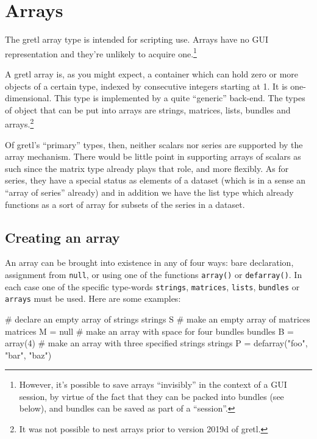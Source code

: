 \section{Arrays}
\label{sec:arrays}

The gretl array type is intended for scripting use. Arrays have no GUI
representation and they're unlikely to acquire one.\footnote{However,
  it's possible to save arrays ``invisibly'' in the context of a GUI
  session, by virtue of the fact that they can be packed into bundles
  (see below), and bundles can be saved as part of a ``session''.}

A gretl array is, as you might expect, a container which can hold zero
or more objects of a certain type, indexed by consecutive integers
starting at 1. It is one-dimensional. This type is implemented by a
quite ``generic'' back-end. The types of object that can be put into
arrays are strings, matrices, lists, bundles and arrays.\footnote{It
  was not possible to nest arrays prior to version 2019d of gretl.}

Of gretl's ``primary'' types, then, neither scalars nor series are
supported by the array mechanism. There would be little point in
supporting arrays of scalars as such since the matrix type already
plays that role, and more flexibly. As for series, they have a special
status as elements of a dataset (which is in a sense an ``array of
series'' already) and in addition we have the list type which already
functions as a sort of array for subsets of the series in a dataset.

\subsection{Creating an array}

An array can be brought into existence in any of four ways: bare
declaration, assignment from \texttt{null}, or using one of the
functions \texttt{array()} or \texttt{defarray()}.  In each case one
of the specific type-words \texttt{strings}, \texttt{matrices},
\texttt{lists}, \texttt{bundles} or \texttt{arrays} must be used. Here
are some examples:

\begin{code}
# declare an empty array of strings
strings S
# make an empty array of matrices
matrices M = null
# make an array with space for four bundles
bundles B = array(4)
# make an array with three specified strings
strings P = defarray("foo", "bar", "baz")
\end{code}

